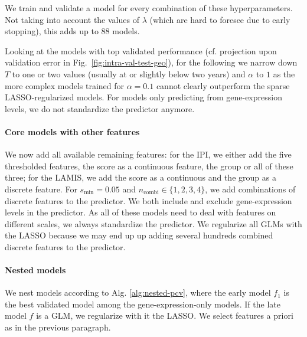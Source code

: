 We train and validate a model for every combination of these hyperparameters.
Not taking into account the values of $\lambda$ (which are hard to foresee due to early stopping), 
this adds up to \num{88} models.

Looking at the models with top validated performance (cf. projection upon validation error in Fig.\
\ref{fig:intra-val-test-geo}), for the following we narrow down $T$ to one or 
two values (usually at or slightly below two years) and $\alpha$ to $1$ as the more complex models 
trained for $\alpha = \num{0.1}$ cannot clearly outperform the sparse LASSO-regularized models. For 
models only predicting from gene-expression levels, we do not standardize the predictor anymore.

\paragraph{Core models with other features}
We now add all available remaining features: for the 
IPI, we either add the five thresholded features, the score as a continuous feature, the group or 
all of these three; for the LAMIS, %
we add the score as a continuous and the group as a discrete feature. For $s_\text{min} = \num{0.05}$ 
and $n_\text{combi} \in \{1, 2, 3, 4 \}$, we add combinations of discrete features to the predictor. 
We both include and exclude gene-expression levels in the predictor.
As all of these models need to deal with features on different scales, we always 
standardize the predictor. We regularize all GLMs with the LASSO because we may end up up adding 
several hundreds combined discrete features to the predictor.

\paragraph{Nested models}
We nest models according to Alg. \ref{alg:nested-pcv}, where the early model $f_1$ is the best 
validated model among the gene-expression-only models. If the late model $f$ is a GLM,
we regularize with it the LASSO. We select features a priori as in the previous 
paragraph.

